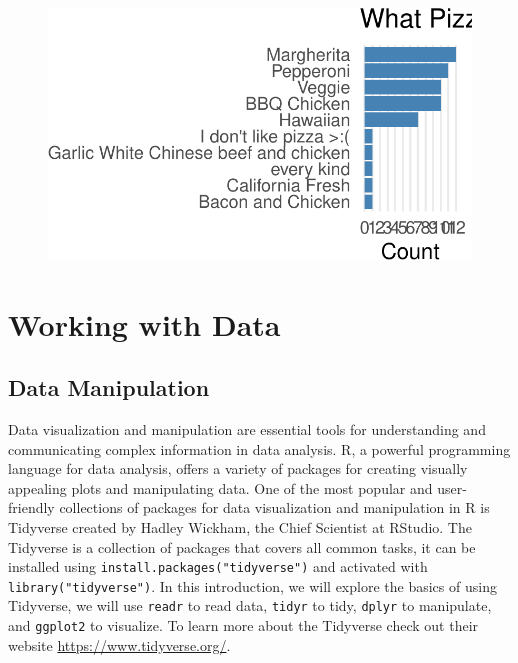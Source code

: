 \documentclass[
  letterpaper,
]{book}
\begin{document}
\begin{figure}[H]

{\centering \includegraphics{./qualtrics_api_files/figure-pdf/unnamed-chunk-9-1.pdf}

}

\end{figure}

\part{Working with Data}

\hypertarget{data-manipulation}{%
\chapter{Data Manipulation}\label{data-manipulation}}

Data visualization and manipulation are essential tools for
understanding and communicating complex information in data analysis. R,
a powerful programming language for data analysis, offers a variety of
packages for creating visually appealing plots and manipulating data.
One of the most popular and user-friendly collections of packages for
data visualization and manipulation in R is Tidyverse created by Hadley
Wickham, the Chief Scientist at RStudio. The Tidyverse is a collection
of packages that covers all common tasks, it can be installed using
\texttt{install.packages("tidyverse")} and activated with
\texttt{library("tidyverse")}. In this introduction, we will explore the
basics of using Tidyverse, we will use \texttt{readr} to read data,
\texttt{tidyr} to tidy, \texttt{dplyr} to manipulate, and
\texttt{ggplot2} to visualize. To learn more about the Tidyverse check
out their website \url{https://www.tidyverse.org/}.
\end{document}
